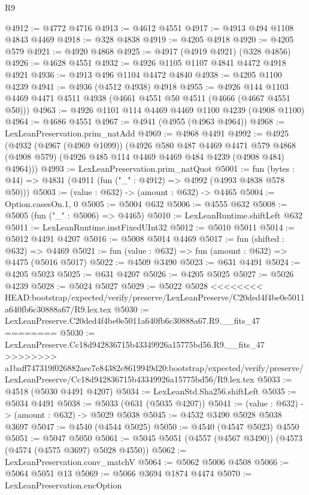 \begin{lexlean}{R9}
\begin{coremodule}
{{{{{{{{{{{{{{{{{{{{{{{{{{{{{{{{{{{{{{{{{{{{{{{{{{{{{{{{{{{{{{{{{{{{{{{{{{{{{{{{{{{{{{{{{{{{{{{{{{{{{{{{{{{{@4912 := @4772 @4716
@4913 := @4612 @4551
@4917 := @4913 @494 @1108 @4843 @4469
@4918 := @328 @4838
@4919 := @4205 @4918
@4920 := @4205 @579
@4921 := @4920 @4868
@4925 := @4917 (@4919 @4921) (@328 @4856)
@4926 := @4628 @4551
@4932 := @4926 @1105 @1107 @4841 @4472 @4918 @4921
@4936 := @4913 @496 @1104 @4472 @4840
@4938 := @4205 @1100 @4239
@4941 := @4936 (@4512 @4938) @4918
@4955 := @4926 @144 @1103 @4469 @4471 @4511 @4938 (@4661 @4551 @50 @4511 (@4666 (@4667 @4551 @50)))
@4963 := @4926 @1101 @114 @4469 @4469 @1100 @4239 (@4908 @1100)
@4964 := @4686 @4551
@4967 := @4941 (@4955 (@4963 @4964))
@4968 := LexLeanPreservation.prim_natAdd
@4969 := @4968 @4491
@4992 := @4925
    (@4932
      (@4967 (@4969 @1099))
      (@4926
        @580
        @487
        @4469
        @4471
        @579
        @4868
        (@4908 @579)
        (@4926 @485 @114 @4469 @4469 @484 @4239 (@4908 @484) @4964)))
@4993 := LexLeanPreservation.prim_natQuot
@5001 := fun (bytes : @44) => @4831 (@4911 (fun ("_" : @4912) => @4992 (@4993 @4838 @578 @50)))
@5003 := (value : @632) -> (amount : @632) -> @4465
@5004 := Option.casesOn.{1, 0}
@5005 := @5004 @632
@5006 := @4555 @632
@5008 := @5005 (fun ("_" : @5006) => @4465)
@5010 := LexLeanRuntime.shiftLeft @632
@5011 := LexLeanRuntime.instFixedUInt32
@5012 := @5010 @5011
@5014 := @5012 @4491 @4207
@5016 := @5008 @5014 @4469
@5017 := fun (shifted : @632) => @4469
@5021 := fun (value : @632) => fun (amount : @632) => @4475 (@5016 @5017)
@5022 := @4509 @3490
@5023 := @631 @4491
@5024 := @4205 @5023
@5025 := @631 @4207
@5026 := @4205 @5025
@5027 := @5026 @4239
@5028 := @5024 @5027
@5029 := @5022 @5028
<<<<<<<< HEAD:bootstrap/expected/verify/preserve/LexLeanPreserve/C20ded4f4be0e5011a640fb6c30888a67/R9.lex.tex
@5030 := LexLeanPreserve.C20ded4f4be0e5011a640fb6c30888a67.R9.__fits_47
========
@5030 := LexLeanPreserve.Cc18d942836715b43349926a15775bd56.R9.__fits_47
>>>>>>>> a1baff747319f026882aec7e84382c8619949d20:bootstrap/expected/verify/preserve/LexLeanPreserve/Cc18d942836715b43349926a15775bd56/R9.lex.tex
@5033 := @4518 (@5030 @4491 @4207)
@5034 := LexLeanStd.Sha256.shiftLeft
@5035 := @5034 @4491
@5038 := @5033 (@631 (@5035 @4207))
@5041 := (value : @632) -> (amount : @632) -> @5029 @5038
@5045 := @4532 @3490 @5028 @5038 @3697
@5047 := @4540 (@4544 @5025)
@5050 := @4540 (@4547 @5023) @4550
@5051 := @5047 @5050
@5061 := @5045 @5051 (@4557 (@4567 @3490)) (@4573 (@4574 (@4575 @3697) @5028 @4550))
@5062 := LexLeanPreservation.conv_matchV
@5064 := @5062 @5006 @4508
@5066 := @5064 @5051 @13
@5069 := @5066 @3694 @1874 @4474
@5070 := LexLeanPreservation.encOption
}}}}}}}}}}}}}}}}}}}}}}}}}}}}}}}}}}}}}}}}}}}}}}}}}}}}}}}}}}}}}}}}}}}}}}}}}}}}}}}}}}}}}}}}}}}}}}}}}}}}}}}}}}}}
\end{coremodule}
\end{lexlean}
